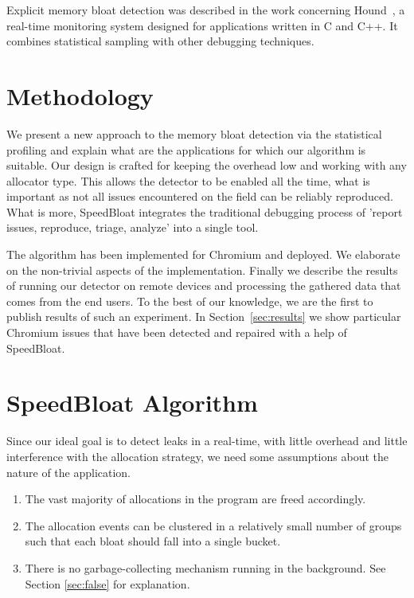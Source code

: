 \documentclass[preprint, numbers]{sigplanconf}
\begin{document}
Explicit memory bloat detection was described in the work concerning Hound~\cite{hound},
a real-time monitoring system designed for applications written in C and C++.
It combines statistical sampling with other debugging techniques.

\section{Methodology}

We present a new approach to the memory bloat detection via the statistical profiling
and explain what are the applications for which our algorithm is suitable.
Our design is crafted for keeping the overhead low and working with any
allocator type.
This allows the detector to be enabled all the time, what is important as not all issues encountered on
the field can be reliably reproduced.
What is more, SpeedBloat integrates the traditional debugging process of 'report issues, reproduce, triage, analyze'
into a single tool.

The algorithm has been implemented for Chromium and deployed.
We elaborate on the non-trivial aspects of the implementation.
Finally we describe the results of running our detector on remote
devices and processing the gathered data that comes from the end users.
To the best of our knowledge, we are the first to publish results
of such an experiment.
In Section~\ref{sec:results} we show particular Chromium issues
that have been detected and repaired with a help of SpeedBloat.

\section{SpeedBloat Algorithm}
\label{sec:algorithm}

Since our ideal goal is to detect leaks in a real-time, with little overhead and little interference with
the allocation strategy, we need some assumptions about the nature of the application.

\begin{enumerate}
\item The vast majority of allocations in the program are freed accordingly.
\item The allocation events can be clustered in a relatively small number of groups
	such that each bloat should fall into a single bucket.
\item There is no garbage-collecting mechanism running in the background.
	See Section \ref{sec:false} for explanation.
\end{enumerate}
\end{document}
